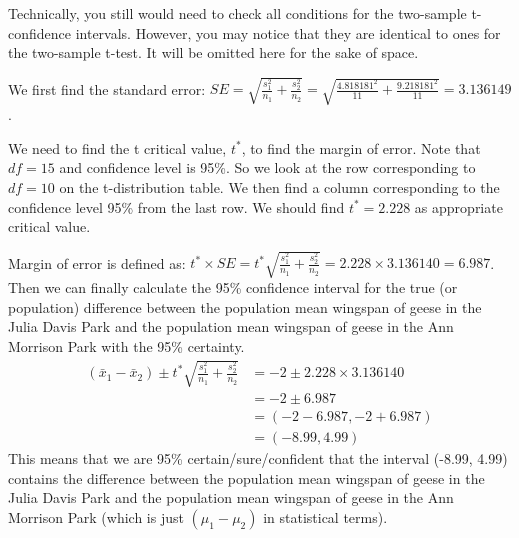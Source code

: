 \documentclass[12pt]{article}
\begin{document}
Technically, you still would need to check all conditions for the two-sample t-confidence intervals. However, you may notice that they are identical to ones for the two-sample t-test. It will be omitted here for the sake of space.

We first find the standard error: $SE = \sqrt{\frac{s_1^2}{n_1} + \frac{s_2^2}{n_2}} = \sqrt{\frac{4.818181^2}{11} + \frac{9.218181^2}{11}} = 3.136149$. 

We need to find the t critical value, $t^*$, to find the margin of error. Note that $df = 15$ and confidence level is 95\%. So we look at the row corresponding to $df = 10$ on the t-distribution table. We then find a column corresponding to the confidence level 95\% from the last row. We should find $t^* = 2.228$ as appropriate critical value.

Margin of error is defined as: $t^* \times SE = t^* \sqrt{\frac{s_1^2}{n_1} + \frac{s_2^2}{n_2}} = 2.228 \times 3.136140 = 6.987$. Then we can finally calculate the 95\% confidence interval for the true (or population) difference between the population mean wingspan of geese in the Julia Davis Park and the population mean wingspan of geese in the Ann Morrison Park with the 95\% certainty.
\begin{align*}
(\bar{x}_1 - \bar{x}_2) \pm t^* \sqrt{\frac{s_1^2}{n_1} + \frac{s_2^2}{n_2}} &= -2 \pm 2.228 \times 3.136140 \\
&= -2 \pm 6.987 \\
&= (-2 - 6.987, -2+6.987) \\
&= (-8.99, 4.99)
\end{align*}
This means that we are 95\% certain/sure/confident that the interval (-8.99, 4.99) contains the difference between the population mean wingspan of geese in the Julia Davis Park and the population mean wingspan of geese in the Ann Morrison Park (which is just $(\mu_1 - \mu_2)$ in statistical terms).
\end{document}
